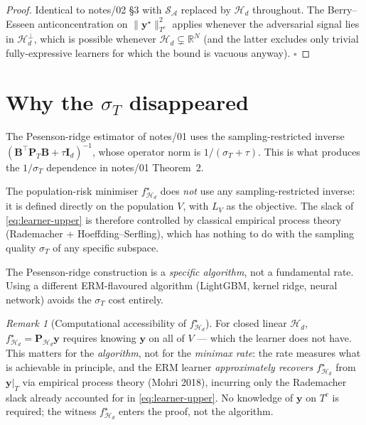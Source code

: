 \documentclass[11pt,a4paper]{article}
\theoremstyle{plain}
\theoremstyle{definition}
\theoremstyle{remark}
\newtheorem{remark}[theorem]{Remark}
\newcommand{\by}{\mathbf{y}}
\newcommand{\bP}{\mathbf{P}}
\newcommand{\bB}{\mathbf{B}}
\newcommand{\bI}{\mathbf{I}}
\newcommand{\R}{\mathbb{R}}
\newcommand{\Scal}{\mathcal{S}}
\newcommand{\Acal}{\mathcal{A}}
\newcommand{\Hcal}{\mathcal{H}}
\begin{document}
\begin{proof}
Identical to notes/02 §3 with $\Scal_\Acal$ replaced by $\Hcal_d$
throughout.  The Berry--Esseen anticoncentration on $\|\by^\star\|^2_{T^c}$
applies whenever the adversarial signal lies in $\Hcal_d^\perp$, which
is possible whenever $\Hcal_d \subsetneq \R^N$ (and the latter excludes
only trivial fully-expressive learners for which the bound is vacuous
anyway).  $\square$
\end{proof}

\section{Why the $\sigma_T$ disappeared}
\label{sec:why}

The Pesenson-ridge estimator of notes/01 uses the sampling-restricted
inverse $(\bB^\top \bP_T \bB + \tau \bI_d)^{-1}$, whose operator norm is
$1/(\sigma_T + \tau)$.  This is what produces the $1/\sigma_T$
dependence in notes/01 Theorem~2.

The population-risk minimiser $f^\star_{\Hcal_d}$ does \emph{not} use
any sampling-restricted inverse: it is defined directly on the
population $V$, with $L_V$ as the objective.  The slack of
\eqref{eq:learner-upper} is therefore controlled by classical empirical
process theory (Rademacher + Hoeffding--Serfling), which has nothing
to do with the sampling quality $\sigma_T$ of any specific subspace.

The Pesenson-ridge construction is a \emph{specific algorithm}, not a
fundamental rate.  Using a different ERM-flavoured algorithm (LightGBM,
kernel ridge, neural network) avoids the $\sigma_T$ cost entirely.

\begin{remark}[Computational accessibility of $f^\star_{\Hcal_d}$]
\label{rem:fstar-accessible}
For closed linear $\Hcal_d$, $f^\star_{\Hcal_d} = \bP_{\Hcal_d}\by$ requires
knowing $\by$ on all of $V$ — which the learner does not have.  This
matters for the \emph{algorithm}, not for the \emph{minimax rate}: the
rate measures what is achievable in principle, and the ERM learner
\emph{approximately recovers $f^\star_{\Hcal_d}$} from $\by|_T$ via
empirical process theory (Mohri 2018), incurring only the Rademacher
slack already accounted for in \eqref{eq:learner-upper}.  No knowledge
of $\by$ on $T^c$ is required; the witness $f^\star_{\Hcal_d}$ enters
the proof, not the algorithm.
\end{remark}
\end{document}
